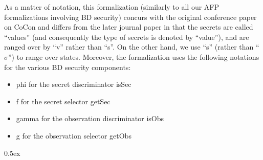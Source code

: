 \documentclass[11pt,a4paper]{article}
\begin{document}
As a matter of notation, this formalization (similarly to all our AFP formalizations involving BD security)
concurs with the original conference paper on CoCon \cite{cocon-CAV2014}
and differs from the later journal paper \cite{cocon-JAR2021}
in
that the secrets are called ``values'' (and consequently the type of secrets is
denoted by ``value''), and are ranged over by ``v'' rather than ``s''. On the other
hand, we use ``s'' (rather than ``$\sigma$'') to range over states.
%
Moreover, the formalization uses the following notations for the various BD
security components:
\begin{itemize}
	\item phi for the secret discriminator isSec
	\item f for the secret selector getSec
	\item gamma for the observation discriminator isObs
	\item g  for the observation selector getObs
\end{itemize}



\parindent 0pt\parskip 0.5ex





\end{document}
